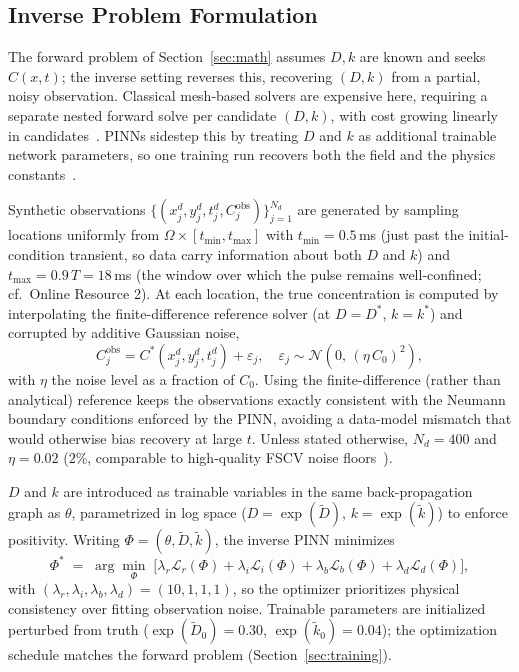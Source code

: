 \documentclass[pdflatex,sn-basic,Numbered]{sn-jnl}
\theoremstyle{thmstyleone}
\theoremstyle{thmstyletwo}
\begin{document}
\subsection{Inverse Problem Formulation}
\label{sec:inverse}

The forward problem of Section~\ref{sec:math} assumes $D,k$ are
known and seeks $C(x,t)$; the inverse setting reverses this,
recovering $(D,k)$ from a partial, noisy observation. Classical
mesh-based solvers are expensive here, requiring a separate
nested forward solve per candidate $(D,k)$, with cost growing
linearly in candidates~\cite{Wiencke2020}. PINNs sidestep this by
treating $D$ and $k$ as additional trainable network parameters,
so one training run recovers both the field and the physics
constants~\cite{Raissi2019, Haghighat2021}.

Synthetic observations
$\{(x_j^d, y_j^d, t_j^d, C_j^{\text{obs}})\}_{j=1}^{N_d}$ are
generated by sampling locations uniformly from
$\Omega \times [t_{\min}, t_{\max}]$ with $t_{\min} = 0.5\,$ms
(just past the initial-condition transient, so data carry
information about both $D$ and $k$) and
$t_{\max} = 0.9\,T = 18\,$ms (the window over which the pulse
remains well-confined; cf.\ Online Resource 2). At each
location, the true concentration is computed by interpolating
the finite-difference reference solver (at $D=D^*$, $k=k^*$)
and corrupted by additive Gaussian noise,
\begin{equation}
  C_j^{\text{obs}} = C^*(x_j^d, y_j^d, t_j^d) + \varepsilon_j,
  \quad \varepsilon_j \sim \mathcal{N}\!\left(0,\,(\eta\, C_0)^2\right),
  \label{eq:observation}
\end{equation}
with $\eta$ the noise level as a fraction of $C_0$. Using the
finite-difference (rather than analytical) reference keeps the
observations exactly consistent with the Neumann boundary
conditions enforced by the PINN, avoiding a data-model mismatch
that would otherwise bias recovery at large $t$. Unless stated
otherwise, $N_d = 400$ and $\eta = 0.02$ ($2\%$, comparable to
high-quality FSCV noise floors~\cite{Rodeberg2017}).

$D$ and $k$ are introduced as trainable variables in the same
back-propagation graph as $\theta$, parametrized in log space
($D = \exp(\tilde{D})$, $k = \exp(\tilde{k})$) to enforce
positivity. Writing $\Phi = (\theta, \tilde{D}, \tilde{k})$, the
inverse PINN minimizes
\begin{equation}
  \Phi^* \;=\; \arg\min_{\Phi}\;
    \big[\lambda_r \mathcal{L}_r(\Phi)
       + \lambda_i \mathcal{L}_i(\Phi)
       + \lambda_b \mathcal{L}_b(\Phi)
       + \lambda_d \mathcal{L}_d(\Phi)\big],
  \label{eq:inverse_loss}
\end{equation}
with $(\lambda_r, \lambda_i, \lambda_b, \lambda_d) = (10,1,1,1)$,
so the optimizer prioritizes physical consistency over fitting
observation noise. Trainable parameters are initialized
perturbed from truth ($\exp(\tilde{D}_0) = 0.30$,
$\exp(\tilde{k}_0) = 0.04$); the optimization schedule matches
the forward problem (Section~\ref{sec:training}).
\end{document}
